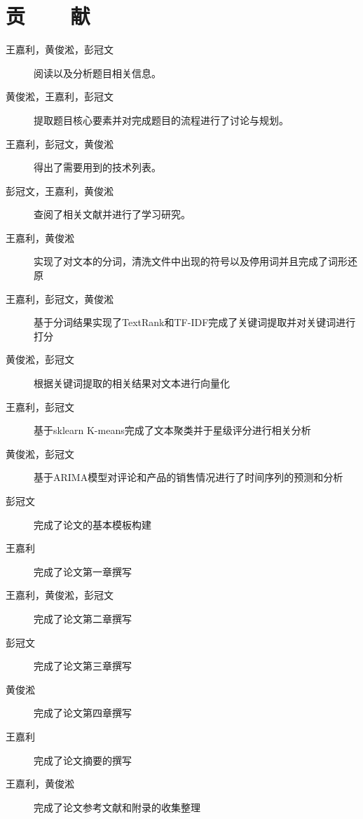 ﻿\renewcommand{\baselinestretch}{1.5}
\fontsize{12pt}{13pt}\selectfont
{}
\chapter*{贡~~~~献}

\begin{description}
    \item[王嘉利，黄俊淞，彭冠文] 阅读以及分析题目相关信息。
    \item[黄俊淞，王嘉利，彭冠文] 提取题目核心要素并对完成题目的流程进行了讨论与规划。
    \item[王嘉利，彭冠文，黄俊淞] 得出了需要用到的技术列表。
    \item[彭冠文，王嘉利，黄俊淞] 查阅了相关文献并进行了学习研究。
    \item[王嘉利，黄俊淞] 实现了对文本的分词，清洗文件中出现的符号以及停用词并且完成了词形还原 
    \item[王嘉利，彭冠文，黄俊淞] 基于分词结果实现了TextRank和TF-IDF完成了关键词提取并对关键词进行打分
    \item[黄俊淞，彭冠文] 根据关键词提取的相关结果对文本进行向量化 
    \item[王嘉利，彭冠文] 基于sklearn K-means完成了文本聚类并于星级评分进行相关分析
    \item[黄俊淞，彭冠文] 基于ARIMA模型对评论和产品的销售情况进行了时间序列的预测和分析
    \item[彭冠文] 完成了论文的基本模板构建
    \item[王嘉利] 完成了论文第一章撰写
    \item[王嘉利，黄俊淞，彭冠文] 完成了论文第二章撰写
    \item[彭冠文] 完成了论文第三章撰写
    \item[黄俊淞] 完成了论文第四章撰写
    \item[王嘉利] 完成了论文摘要的撰写
    \item[王嘉利，黄俊淞] 完成了论文参考文献和附录的收集整理            
\end{description}

\clearpage
\endinput
